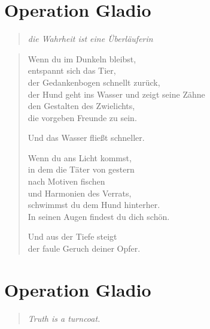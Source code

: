 
\cleartoverso

\section{Operation Gladio}

\begin{quote}
\itshape\smaller
die Wahrheit ist eine Überläuferin

\end{quote}

\begin{verse}

Wenn du im Dunkeln bleibst,\\
entspannt sich das Tier,\\
der Gedankenbogen schnellt zurück,\\
der Hund geht ins Wasser und zeigt seine Zähne\\
den Gestalten des Zwielichts,\\
die vorgeben Freunde zu sein.

Und das Wasser fließt schneller.

Wenn du ans Licht kommst,\\
in dem die Täter von gestern\\
nach Motiven fischen\\
und Harmonien des Verrats,\\
schwimmst du dem Hund hinterher.\\
In seinen Augen findest du dich schön.

Und aus der Tiefe steigt\\
der faule Geruch deiner Opfer.

\end{verse}

\clearpage

\section{Operation Gladio}
\label{gladio}

\begin{quote}
\itshape\smaller
Truth is a turncoat.

\end{quote}

